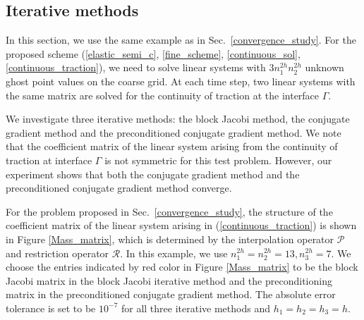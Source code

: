 \subsection{Iterative methods}\label{iterative_section}
In this section, we use the same example as in Sec.~\ref{convergence_study}. For the proposed scheme (\ref{elastic_semi_c}, \ref{fine_scheme}, \ref{continuous_sol}, \ref{continuous_traction}), we need to solve linear systems with $3n_1^{2h}n_2^{2h}$ unknown ghost point values on the coarse grid. At each time step, two linear systems with the same matrix are solved for the continuity of traction at the interface $\Gamma$. 

We investigate three iterative methods: the block Jacobi method, the conjugate gradient method  and the preconditioned conjugate gradient method. We note that the coefficient matrix of the linear system arising from the continuity of traction at interface $\Gamma$ is not symmetric for this test problem. However, our experiment shows that both the conjugate gradient method and the preconditioned conjugate gradient method converge.

For the problem proposed in Sec.~\ref{convergence_study}, the structure of the coefficient matrix of the linear system arising in (\ref{continuous_traction}) is shown in Figure \ref{Mass_matrix}, which is determined by the interpolation operator ${\mathcal{P}}$ and restriction operator ${\mathcal{R}}$. In this example, we use $n_1^{2h} = n_2^{2h}=13, n_3^{2h} = 7$. We choose the entries indicated by red color in Figure \ref{Mass_matrix} to be the block Jacobi matrix in the block Jacobi iterative method and the preconditioning matrix in the preconditioned conjugate gradient  method. The absolute error tolerance is set to be $10^{-7}$ for all three iterative methods and $h_1 = h_2 = h_3 = h$.

